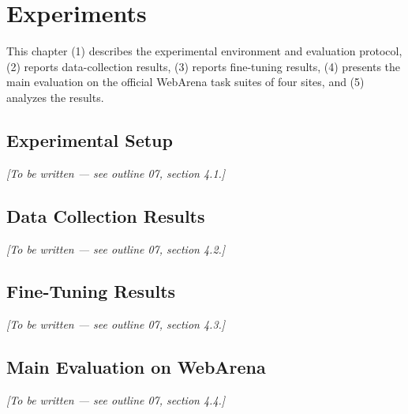 \chapter{Experiments}
\label{ch:experiments}

This chapter (1) describes the experimental environment and evaluation
protocol, (2) reports data-collection results, (3) reports fine-tuning
results, (4) presents the main evaluation on the official WebArena task
suites of four sites, and (5) analyzes the results.


\section{Experimental Setup}
\label{sec:exp-setup}
\textit{[To be written — see outline 07, section 4.1.]}

\section{Data Collection Results}
\label{sec:exp-data}
\textit{[To be written — see outline 07, section 4.2.]}

\section{Fine-Tuning Results}
\label{sec:exp-sft}
\textit{[To be written — see outline 07, section 4.3.]}

\section{Main Evaluation on WebArena}
\label{sec:exp-main}
\textit{[To be written — see outline 07, section 4.4.]}

